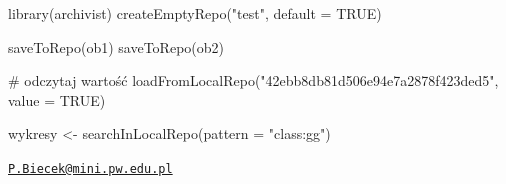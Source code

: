 \begin{Schunk}
\begin{Sinput}
library(archivist)
createEmptyRepo("test", default = TRUE)

saveToRepo(ob1)
saveToRepo(ob2)

# odczytaj wartość
loadFromLocalRepo("42ebb8db81d506e94e7a2878f423ded5", value = TRUE)

wykresy <- searchInLocalRepo(pattern = "class:gg")
\end{Sinput}
\end{Schunk}

\citep{R}



\address{
Przemysław Biecek\\
MiNI Politechnika Warszawska\\
line Koszykowa 75\\ line Warszawa, Polska\\
}
\href{mailto:P.Biecek@mini.pw.edu.pl}{\nolinkurl{P.Biecek@mini.pw.edu.pl}}

